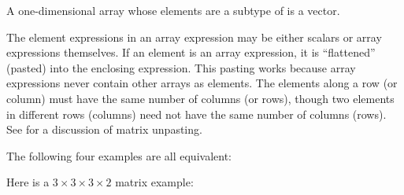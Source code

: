 A one-dimensional array whose elements are a subtype of 
is a vector.

The element expressions in an array expression may be either scalars or
array expressions themselves.  If an element is an array expression,
it is ``flattened'' (pasted) into the enclosing expression.
This pasting works because array expressions never
contain other arrays as elements.  The elements along
a row (or column) must have the same number of columns (or rows),
though two elements in different rows (columns) need not have the
same number of columns (rows).
See  for a discussion of matrix unpasting.



The following four examples are all equivalent:




Here is a $3\times3\times3\times2$ matrix example:

